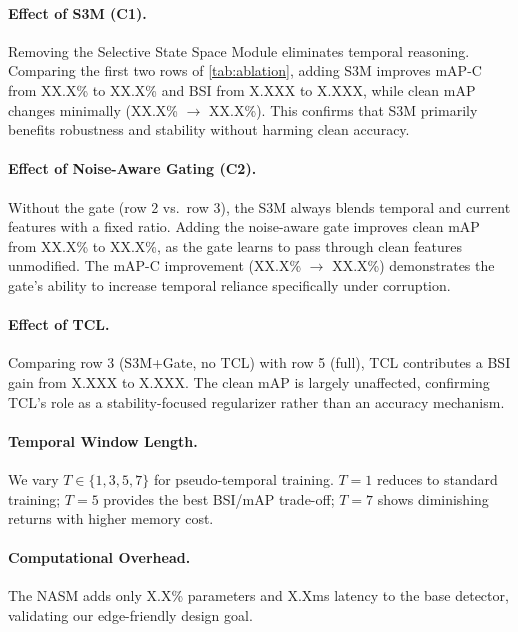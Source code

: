 \documentclass[review]{eccv2026}
\newcommand{\ablBaseMap}{XX.X}
\newcommand{\ablBaseMapC}{XX.X}
\newcommand{\ablBaseBsi}{X.XXX}
\newcommand{\ablSSMMap}{XX.X}
\newcommand{\ablSSMMapC}{XX.X}
\newcommand{\ablSSMBsi}{X.XXX}
\newcommand{\ablSSMGateMap}{XX.X}
\newcommand{\ablSSMGateMapC}{XX.X}
\newcommand{\ablSSMGateBsi}{X.XXX}
\newcommand{\ablFullBsi}{X.XXX}
\newcommand{\overheadPct}{X.X}
\newcommand{\overheadMs}{X.X}
\begin{document}
\paragraph{Effect of S3M (C1).}
Removing the Selective State Space Module eliminates temporal reasoning.
Comparing the first two rows of \cref{tab:ablation}, adding S3M improves mAP-C from \ablBaseMapC\% to \ablSSMMapC\% and BSI from \ablBaseBsi{} to \ablSSMBsi{}, while clean mAP changes minimally (\ablBaseMap\% $\to$ \ablSSMMap\%).
This confirms that S3M primarily benefits robustness and stability without harming clean accuracy.

\paragraph{Effect of Noise-Aware Gating (C2).}
Without the gate (row 2 vs.\ row 3), the S3M always blends temporal and current features with a fixed ratio.
Adding the noise-aware gate improves clean mAP from \ablSSMMap\% to \ablSSMGateMap\%, as the gate learns to pass through clean features unmodified.
The mAP-C improvement (\ablSSMMapC\% $\to$ \ablSSMGateMapC\%) demonstrates the gate's ability to increase temporal reliance specifically under corruption.

\paragraph{Effect of TCL.}
Comparing row 3 (S3M+Gate, no TCL) with row 5 (full), TCL contributes a BSI gain from \ablSSMGateBsi{} to \ablFullBsi{}.
The clean mAP is largely unaffected, confirming TCL's role as a stability-focused regularizer rather than an accuracy mechanism.

\paragraph{Temporal Window Length.}
We vary $T \in \{1, 3, 5, 7\}$ for pseudo-temporal training.
$T=1$ reduces to standard training; $T=5$ provides the best BSI/mAP trade-off; $T=7$ shows diminishing returns with higher memory cost.

\paragraph{Computational Overhead.}
The NASM adds only \overheadPct\% parameters and \overheadMs{}ms latency to the base detector, validating our edge-friendly design goal.

\end{document}
